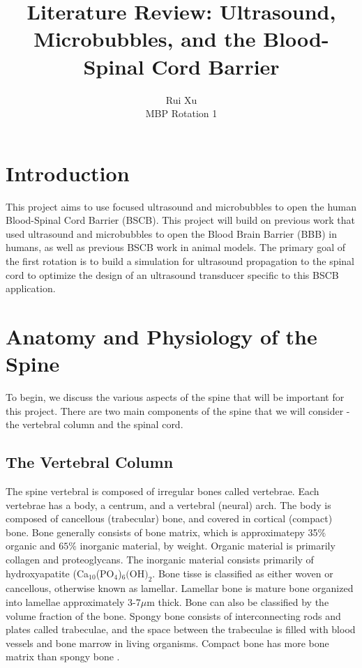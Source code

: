 \documentclass[11pt,titlepage]{article} %
\title{Literature Review: Ultrasound, Microbubbles, and the Blood-Spinal Cord Barrier}
\author{Rui Xu\\MBP Rotation 1}
\date{} %
\begin{document}
\maketitle

\newpage


\section{Introduction}

This project aims to use focused ultrasound and microbubbles to open the human Blood-Spinal Cord Barrier (BSCB). This project will build on previous work that used ultrasound and microbubbles to open the Blood Brain Barrier (BBB) in humans, as well as previous BSCB work in animal models. The primary goal of the first rotation is to build a simulation for ultrasound propagation to the spinal cord to optimize the design of an ultrasound transducer specific to this BSCB application. 

\section{Anatomy and Physiology of the Spine}

To begin, we discuss the various aspects of the spine that will be important for this project. There are two main components of the spine that we will consider - the vertebral column and the spinal cord.

\subsection{The Vertebral Column}
The spine vertebral is composed of irregular bones called vertebrae. Each vertebrae has a body, a centrum, and a vertebral (neural) arch. The body is composed of cancellous (trabecular) bone, and covered in cortical (compact) bone. Bone generally consists of bone matrix, which is approximatepy 35$\%$ organic and $65\%$ inorganic material, by weight. Organic material is primarily collagen and proteoglycans. The inorganic material consists primarily of hydroxyapatite (Ca$_{10}$(PO$_4$)$_6($OH$)_2$. Bone tisse is classified as either woven or cancellous, otherwise known as lamellar. Lamellar bone is mature bone organized into lamellae approximately 3-7$\mu$m thick. Bone can also be classified by the volume fraction of the bone. Spongy bone consists of interconnecting rods and plates called trabeculae, and the space between the trabeculae is filled with blood vessels and bone marrow in living organisms. Compact bone has more bone matrix than spongy bone \cite{vanputte2016seeley}. 
\end{document}
